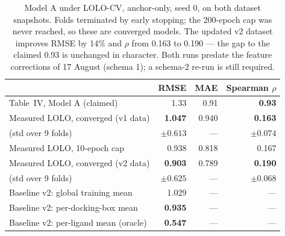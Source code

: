 \documentclass[11pt,a4paper]{article}
\newcommand{\bad}[1]{\textcolor{badred}{#1}}
\begin{document}
\begin{table}[h]\centering
\begin{tabular}{@{}lrrr@{}}
\toprule
 & \textbf{RMSE} & \textbf{MAE} & \textbf{Spearman $\rho$} \\
\midrule
Table~IV, Model A (claimed)          & 1.33 & 0.91 & \textbf{0.93} \\
\midrule
Measured LOLO, converged (v1 data)   & \textbf{1.047} & 0.940 & \bad{\textbf{0.163}} \\
\quad (std over 9 folds)             & $\pm 0.613$ & --- & $\pm 0.074$ \\
Measured LOLO, 10-epoch cap          & 0.938 & 0.818 & 0.167 \\
\midrule
Measured LOLO, converged (v2 data)   & \textbf{0.903} & 0.789 & \bad{\textbf{0.190}} \\
\quad (std over 9 folds)             & $\pm 0.625$ & --- & $\pm 0.068$ \\
\midrule
Baseline v2: global training mean    & 1.029 & --- & --- \\
Baseline v2: per-docking-box mean    & \textbf{0.935} & --- & --- \\
Baseline v2: per-ligand mean (oracle)& \textbf{0.547} & --- & --- \\
\bottomrule
\end{tabular}
\caption{Model A under LOLO-CV, anchor-only, seed 0, on both dataset
snapshots. Folds terminated by early stopping; the 200-epoch cap was never
reached, so these are converged models. The updated v2 dataset improves RMSE
by 14\% and $\rho$ from 0.163 to 0.190 --- \bad{the gap to the claimed 0.93
is unchanged in character}. Both runs predate the feature corrections of
17 August (schema 1); a schema-2 re-run is still required.}
\end{table}
\end{document}
